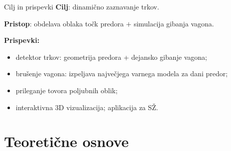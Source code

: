 \documentclass[11pt,aspectratio=169]{beamer}
\begin{document}
\begin{frame}{Cilj in prispevki}
    \textbf{Cilj}: dinamično zaznavanje trkov.

    \vspace{0.5em}
    \textbf{Pristop}: obdelava oblaka točk predora $+$ simulacija gibanja vagona.

    \vspace{0.5em}
    \textbf{Prispevki:}
    \begin{itemize}
        \item detektor trkov: geometrija predora + dejansko gibanje vagona;
        \item brušenje vagona: izpeljava največjega varnega modela za dani predor;
        \item prileganje tovora poljubnih oblik;
        \item interaktivna 3D vizualizacija; aplikacija za SŽ.
    \end{itemize}
\end{frame}

\section{Teoretične osnove}
\end{document}
